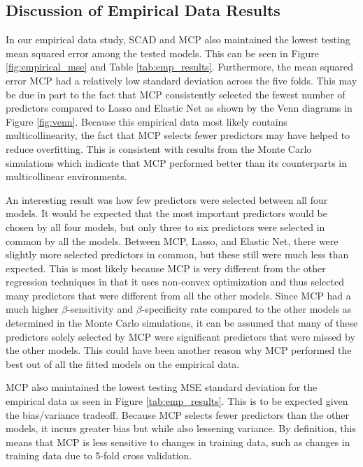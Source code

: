 \documentclass{article}
\begin{document}
	\subsection{Discussion of Empirical Data Results}
	In our empirical data study, SCAD and MCP also maintained the lowest testing mean squared error among the tested models. This can be seen in Figure \ref{fig:empirical_mse} and Table \ref{tab:emp_results}. Furthermore, the mean squared error MCP had a relatively low standard deviation across the five folds. This may be due in part to the fact that MCP consistently selected the fewest number of predictors compared to Lasso and Elastic Net as shown by the Venn diagrams in Figure \ref{fig:venn}. Because this empirical data most likely contains multicollinearity, the fact that MCP selects fewer predictors may have helped to reduce overfitting. This is consistent with results from the Monte Carlo simulations which indicate that MCP performed better than its counterparts in multicollinear environments.
	
	An interesting result was how few predictors were selected between all four models. It would be expected that the most important predictors would be chosen by all four models, but only three to six predictors were selected in common by all the models. Between MCP, Lasso, and Elastic Net, there were slightly more selected predictors in common, but these still were much less than expected. This is most likely because MCP is very different from the other regression techniques in that it uses non-convex optimization and thus selected many predictors that were different from all the other models. Since MCP had a much higher $\beta$-sensitivity and $\beta$-specificity rate compared to the other models as determined in the Monte Carlo simulations, it can be assumed that many of these predictors solely selected by MCP were significant predictors that were missed by the other models. This could have been another reason why MCP performed the best out of all the fitted models on the empirical data. 
	
	MCP also maintained the lowest testing MSE standard deviation for the empirical data as seen in Figure \ref{tab:emp_results}. This is to be expected given the bias/variance tradeoff. Because MCP selects fewer predictors than the other models, it incurs greater bias but while also lessening variance. By definition, this means that MCP is less sensitive to changes in training data, such as changes in training data due to 5-fold cross validation. 
	
\end{document}
